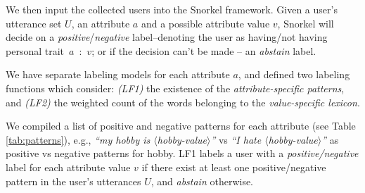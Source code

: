 We then input the collected users into the Snorkel framework. Given a user's utterance set $U$, an attribute $a$ and a possible attribute value $v$, Snorkel will decide on a \emph{positive}/\emph{negative} label--denoting the user as having/not having personal trait~$a$~:~$v$; or if the decision can't be made -- an \emph{abstain} label.%

We have separate labeling models for each attribute $a$, and defined two labeling functions which consider: \emph{(LF1)} the existence of the \emph{attribute-specific patterns}, and \emph{(LF2)} the weighted count of the words belonging to the \emph{value-specific lexicon}.

 We compiled a list of positive and negative patterns for each attribute (see Table \ref{tab:patterns}), e.g., \emph{``my hobby is $\langle$hobby-value$\rangle$''} vs \emph{``I hate $\langle$hobby-value$\rangle$''} as positive vs negative patterns for hobby.
LF1 labels a user with a \emph{positive/negative} label for each attribute value $v$ if there exist at least one positive/negative pattern in the user's utterances $U$, and \emph{abstain} otherwise.

